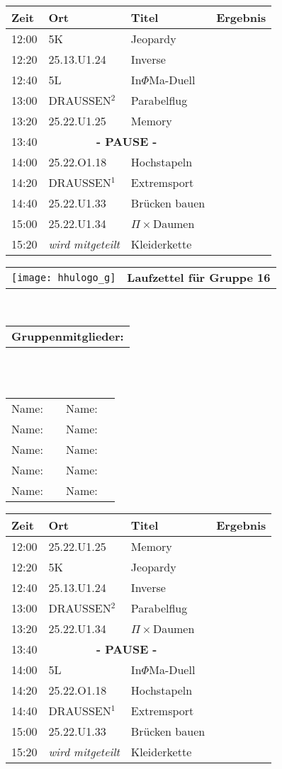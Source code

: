 \documentclass[a4paper,10pt]{article}
\def\spiela{25.22.U1.33 & Brücken bauen}
\def\spielb{DRAUSSEN$^1$ \footnotetext[1]{zwischen 25.22.U1 und 25.13.U1} & Extremsport}
\def\spielc{25.22.O1.18 & Hochstapeln}
\def\spield{5L & In$\Phi $Ma-Duell}
\def\spielee{ 25.13.U1.24 & Inverse}
\def\spielf{5K & Jeopardy}
\def\spielgg{25.22.U1.25 & Memory}
\def\spielh{DRAUSSEN$^2$ \footnotetext[2]{zwischen 25.22.U1 und 25.33.U1} & Parabelflug}
\def\spieli{ 25.22.U1.34 & $\Pi \times $Daumen}
\def\spielj{\textit{wird mitgeteilt} & Kleiderkette}
\def\pause{\multicolumn{2}{|c|}{\textbf{- PAUSE -}}}
\newcommand{\oben}[1]{

\begin{tabularx}{\textwidth}{lc}
  \texttt{[image: hhulogo\_g]}
& {\Huge \textbf{Laufzettel für Gruppe #1}}
\end{tabularx}
\large
\vspace{0.5cm} \\
\begin{tabularx}{\textwidth}{l}\textbf{Gruppenmitglieder:} \end{tabularx}\\ \phantom{blub}\\
\begin{tabularx}{\textwidth}{p{0.1\textwidth}p{0.4\textwidth}p{0.1\textwidth}p{0.4\textwidth}}
Name: & \underline{\hspace{6cm}} & Name: & \underline{\hspace{6cm}}\\
Name: & \underline{\hspace{6cm}} & Name: & \underline{\hspace{6cm}}\\
Name: & \underline{\hspace{6cm}} & Name: & \underline{\hspace{6cm}}\\
Name: & \underline{\hspace{6cm}} & Name: & \underline{\hspace{6cm}}\\
Name: & \underline{\hspace{6cm}} & Name: & \underline{\hspace{6cm}}\\
\end{tabularx}



}
\begin{document}
  \LARGE
  \begin{center}
  \vspace{1cm}
  \begin{tabularx}{\textwidth}{p{2.5cm}||p{4.5cm}|p{6.5cm}|l}

  \textbf{Zeit}  & \textbf{Ort} 	&\textbf{Titel} 		& \textbf{Ergebnis} 	\\ \hline \hline

  12:00 &\spielf			&		\\ \hline
  12:20 &\spielee			&		\\ \hline
  12:40 &\spield			&		\\ \hline

  13:00 &\spielh		 	&		\\ \hline
  13:20 &\spielgg			&		\\ \hline
  13:40 &\pause			&		\\ \hline

  14:00 &\spielc			&		\\ \hline
  14:20 &\spielb			&		\\ \hline
  14:40 &\spiela			&		\\ \hline 

  15:00 &\spieli			&		\\ \hline \hline
  15:20 &\spielj			&

  \end{tabularx}
  \end{center}

  \newpage


  \oben{16}

  \LARGE
  \begin{center}
  \vspace{1cm}
  \begin{tabularx}{\textwidth}{p{2.5cm}||p{4.5cm}|p{6.5cm}|l}

  \textbf{Zeit}  & \textbf{Ort} 	&\textbf{Titel} 		& \textbf{Ergebnis} 	\\ \hline \hline

  12:00 &\spielgg			&		\\ \hline
  12:20 &\spielf			&		\\ \hline
  12:40 &\spielee			&		\\ \hline

  13:00 &\spielh		 	&		\\ \hline
  13:20 &\spieli			&		\\ \hline
  13:40 &\pause			&		\\ \hline

  14:00 &\spield			&		\\ \hline
  14:20 &\spielc			&		\\ \hline
  14:40 &\spielb			&		\\ \hline 

  15:00 &\spiela			&		\\ \hline \hline
  15:20 &\spielj			&

  \end{tabularx}
  \end{center}
\end{document}
